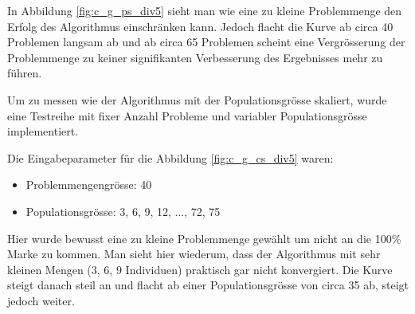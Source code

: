 In Abbildung \ref{fig:c_g_ps_div5} sieht man wie eine zu kleine Problemmenge den Erfolg des Algorithmus einschränken kann. Jedoch flacht die Kurve ab circa 40 Problemen langsam ab und ab circa 65 Problemen scheint eine Vergrösserung der Problemmenge zu keiner signifikanten Verbesserung des Ergebnisses mehr zu führen.


Um zu messen wie der Algorithmus mit der Populationsgrösse skaliert, wurde eine Testreihe mit fixer Anzahl Probleme und variabler Populationsgrösse implementiert.

Die Eingabeparameter für die Abbildung \ref{fig:c_g_cs_div5} waren:
\begin{itemize}
	\item Problemmengengrösse: 40
	\item Populationsgrösse: 3, 6, 9, 12, ..., 72, 75
\end{itemize}

Hier wurde bewusst eine zu kleine Problemmenge gewählt um nicht an die 100\% Marke zu kommen. Man sieht hier wiederum, dass der Algorithmus mit sehr kleinen Mengen ($3$, $6$, $9$ Individuen) praktisch gar nicht konvergiert. Die Kurve steigt danach steil an und flacht ab einer Populationsgrösse von circa 35 ab, steigt jedoch weiter.